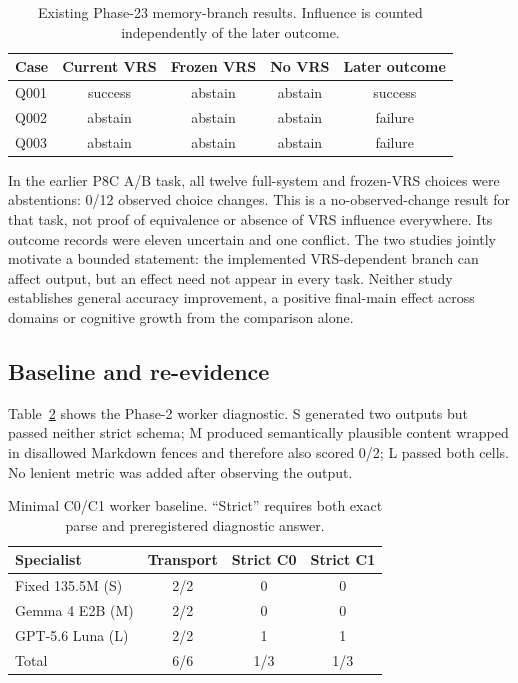 \documentclass[11pt]{article}
\begin{document}
\begin{table}[ht]
\centering
\caption{Existing Phase-23 memory-branch results. Influence is counted independently of the later outcome.}
\label{tab:vrs-influence}
\begin{tabular}{lcccc}
\toprule
Case & Current VRS & Frozen VRS & No VRS & Later outcome \\
\midrule
Q001 & success & abstain & abstain & success \\
Q002 & abstain & abstain & abstain & failure \\
Q003 & abstain & abstain & abstain & failure \\
\bottomrule
\end{tabular}
\end{table}

In the earlier P8C A/B task, all twelve full-system and frozen-VRS choices were abstentions: 0/12 observed choice changes. This is a no-observed-change result for that task, not proof of equivalence or absence of VRS influence everywhere. Its outcome records were eleven uncertain and one conflict. The two studies jointly motivate a bounded statement: the implemented VRS-dependent branch can affect output, but an effect need not appear in every task. Neither study establishes general accuracy improvement, a positive final-main effect across domains or cognitive growth from the comparison alone.

\subsection{Baseline and re-evidence}

Table~\ref{tab:baseline} shows the Phase-2 worker diagnostic.  S generated two outputs but passed neither strict schema; M produced semantically plausible content wrapped in disallowed Markdown fences and therefore also scored 0/2; L passed both cells.  No lenient metric was added after observing the output.

\begin{table}[t]
\centering
\caption{Minimal C0/C1 worker baseline.  ``Strict'' requires both exact parse and preregistered diagnostic answer.}
\label{tab:baseline}
\begin{tabular}{lccc}
\toprule
Specialist & Transport & Strict C0 & Strict C1 \\
\midrule
Fixed 135.5M (S) & 2/2 & 0 & 0 \\
Gemma 4 E2B (M) & 2/2 & 0 & 0 \\
GPT-5.6 Luna (L) & 2/2 & 1 & 1 \\
\midrule
Total & 6/6 & 1/3 & 1/3 \\
\bottomrule
\end{tabular}
\end{table}
\end{document}
